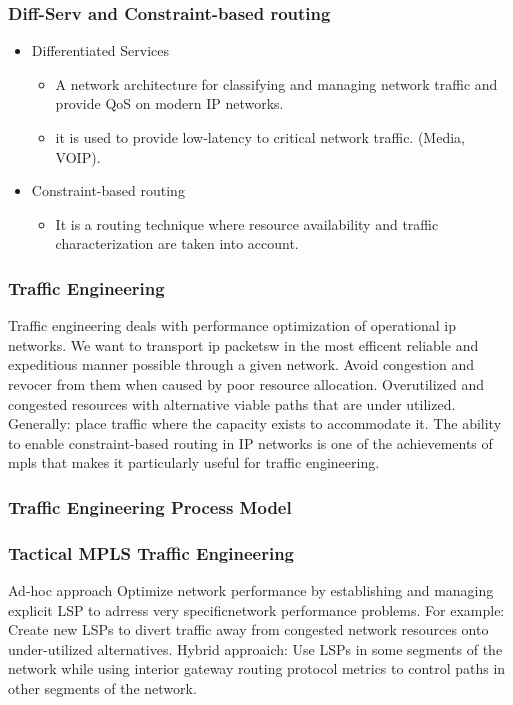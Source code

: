 \documentclass[12pt]{beamer}
\begin{document}
\begin{frame}
	\frametitle{Diff-Serv and Constraint-based routing}
		\begin{itemize}
			\item Differentiated Services
				\begin{itemize}
					\item A network architecture for classifying and managing network traffic and provide QoS on modern IP networks.
					\item it is used to provide low-latency to critical network traffic. (Media, VOIP).
				\end{itemize}
			\item Constraint-based routing
				\begin{itemize}
					\item It is a routing technique where resource availability and traffic characterization are taken into account.
				\end{itemize}
		\end{itemize}
\end{frame}

\begin{frame}
    \frametitle{Traffic Engineering}
	Traffic engineering deals with performance optimization of operational ip networks. We want to transport ip packetsw in the most efficent reliable and expeditious manner possible through a given network.
    Avoid congestion and revocer from them when caused by poor resource allocation.
    Overutilized and congested resources with alternative viable paths that are under utilized.
    Generally: place traffic where the capacity exists to accommodate it.
    The ability to enable constraint-based routing in IP networks is one of the achievements of mpls that makes it particularly useful for traffic engineering.
\end{frame}

\begin{frame}
    \frametitle{Traffic Engineering Process Model}
\end{frame}

\begin{frame}
    \frametitle{Tactical MPLS Traffic Engineering}
    Ad-hoc approach
    Optimize network performance by establishing and managing explicit LSP to adrress very specificnetwork performance problems.
    For example: Create new LSPs to divert traffic away from congested network resources onto under-utilized alternatives.
    Hybrid approaich: Use LSPs in some segments of the network while using interior gateway routing protocol metrics to control paths in other segments of the network.
\end{frame}
\end{document}
